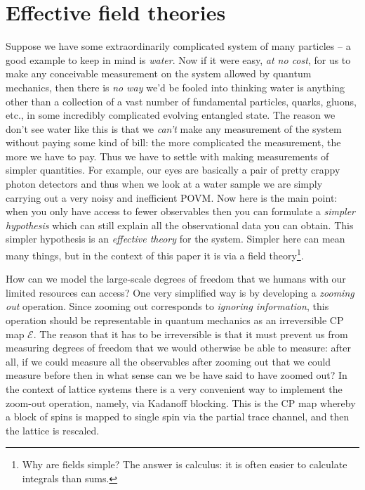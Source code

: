 \documentclass[11pt]{amsart}
\theoremstyle{plain}%
\theoremstyle{definition}
\theoremstyle{remark}
\begin{document}
\section{Effective field theories}\label{sec:effectivetheories}

Suppose we have some extraordinarily complicated system of many particles -- a good example to keep in mind is \emph{water}. Now if it were easy, \emph{at no cost}, for us to make any conceivable measurement on the system allowed by quantum mechanics, then there is \emph{no way} we'd be fooled into thinking water is anything other than a collection of a vast number of fundamental particles, quarks, gluons, etc., in some incredibly complicated evolving entangled state. The reason we don't see water like this is that we \emph{can't} make any measurement of the system without paying some kind of bill: the more complicated the measurement, the more we have to pay. Thus we have to settle with making measurements of simpler quantities. For example, our eyes are basically a pair of pretty crappy photon detectors and thus when we look at a water sample we are simply carrying out a very noisy and inefficient POVM. Now here is the main point: when you only have access to fewer observables then you can formulate a \emph{simpler hypothesis} which can still explain all the observational data you can obtain. This simpler hypothesis is an \emph{effective theory} for the system. Simpler here can mean many things, but in the context of this paper it is via a field theory\footnote{Why are fields simple? The answer is calculus: it is often easier to calculate integrals than sums.}.

How can we model the large-scale degrees of freedom that we humans with our limited resources can access? One very simplified way is by developing a \emph{zooming out} operation. Since zooming out corresponds to \emph{ignoring information}, this operation should be representable in quantum mechanics as an irreversible CP map $\mathcal{E}$. The reason that it has to be irreversible is that it must prevent us from measuring degrees of freedom that we would otherwise be able to measure: after all, if we could measure all the observables after zooming out that we could measure before then in what sense can we be have said to have zoomed out? In the context of lattice systems there is a very convenient way to implement the zoom-out operation, namely, via Kadanoff blocking. This is the CP map whereby a block of spins is mapped to single spin via the partial trace channel, and then the lattice is rescaled.
\end{document}
